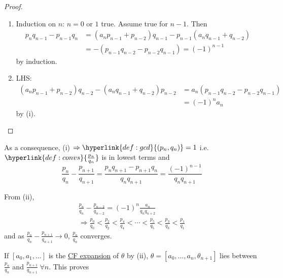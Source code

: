 \documentclass{article}
\begin{document}
\begin{proof}\leavevmode
    \begin{enumerate}[label=(\roman*)]
        \item Induction on $n$: $n=0$ or $1$ true.
            Assume true for $n-1$. Then
            \begin{align*}
                p_n q_{n-1} - p_{n-1} q_n &= (a_n p_{n-1} + p_{n-2}) q_{n-1} - p_{n-1} (a_n q_{n-1} + q_{n-2}) \\
                                          &= -(p_{n-1} q_{n-2} - p_{n-2} q_{n-1}) = (-1)^{n-1}
            \end{align*}
            by induction.
        \item LHS:
            \begin{align*}
                (a_n p_{n-1} + p_{n-2}) q_{n-2} - (a_n q_{n-1} + q_{n-2}) p_{n-2} &= a_n (p_{n-1} q_{n-2} - p_{n-2} q_{n-1}) \\
                                                                                  &= (-1)^n a_n
            \end{align*}
            by (i). \qedhere
    \end{enumerate}
\end{proof}

\begin{remark}
    As a consequence,
    (i) $\Rightarrow \hyperlink{def:gcd}{(p_n, q_n)} = 1$ i.e. $\hyperlink{def:convs}{\frac{p_n}{q_n}}$ is in lowest terms and
    \begin{equation*}
        \frac{p_n}{q_n} - \frac{p_{n+1}}{q_{n+1}} = \frac{p_n q_{n+1} - p_{n+1} q_n}{q_n q_{n+1}} = \frac{(-1)^{n-1}}{q_n q_{n+1}}
    \end{equation*}

    From (ii),
    \begin{gather*}
        \frac{p_n}{q_n} - \frac{p_{n-2}}{q_{n-2}} = (-1)^n \frac{a_n}{q_n q_{n+2}} \\
        \Rightarrow \frac{p_0}{q_0} < \frac{p_2}{q_2} < \frac{p_4}{q_4} < \dotsb < \frac{p_5}{q_5} < \frac{p_3}{q_3} < \frac{p_1}{q_1}
    \end{gather*}
    and as $\frac{p_n}{q_n} - \frac{p_{n+1}}{q_{n+1}} \to 0$, $\frac{p_n}{q_n}$ converges.

    If $[a_0, a_1, \dotsc]$ is the \hyperlink{def:cfa}{CF expansion} of $\theta$ by (ii), $\theta = [a_0, \dotsc, a_n, \theta_{n+1}]$ lies between $\frac{p_n}{q_n}$ and $\frac{p_{n+1}}{q_{n+1}} \ \forall n$.
    This proves
\end{remark}
\end{document}
